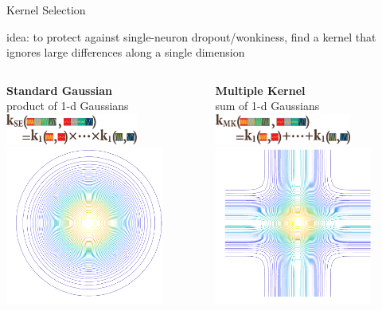 \documentclass[aspectratio=169,19pt,xetex,handout]{beamer}
\begin{document}
\begin{frame}{Kernel Selection}
\Large

idea: to protect against single-neuron dropout/wonkiness, find a kernel that ignores large differences along a single dimension

\begin{columns}[T] %
\centering
\textbf{Standard Gaussian} \\
product of 1-d Gaussians \\
\includegraphics[height=1cm]{se2alt} \\
\includegraphics[height=0.6\textwidth]{se2d}

\centering
\textbf{Multiple Kernel} \\
sum of 1-d Gaussians~\cite{Gon11} \\
\includegraphics[height=1cm]{mk2alt} \\
\includegraphics[height=0.6\textwidth]{mk2d}

\end{columns}
\end{frame}
\end{document}
